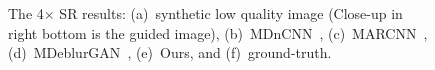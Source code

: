 \documentclass[runningheads]{llncs}
\begin{document}
\begin{figure}[t]
{\begin{minipage}[b]{.16\columnwidth}
  \end{minipage}
}
\hspace{-3ex}
  \caption{The 4$\times$ SR results: (a)~synthetic low quality image (Close-up in right bottom is the guided image), (b)~MDnCNN~\cite{zhang2017beyond}, (c)~MARCNN~\cite{Dong2015ICCV}, (d)~MDeblurGAN~\cite{DeblurGAN}, (e)~Ours, and (f)~ground-truth.}
  \label{fig:x4}
\end{figure}
\end{document}
